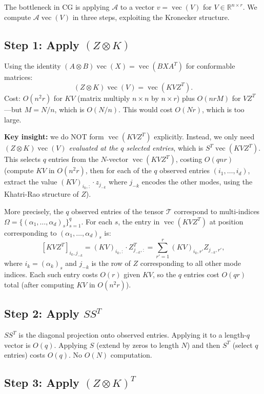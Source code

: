 \documentclass[12pt]{article}
\newcommand{\bR}{\mathbb{R}}
\DeclareMathOperator{\vecop}{vec}
\newcommand{\bR}{\mathbb{R}}
\begin{document}
The bottleneck in CG is applying $\mathcal{A}$ to a vector $v = \vecop(V)$ for $V\in\bR^{n\times r}$.  We compute $\mathcal{A}\vecop(V)$ in three steps, exploiting the Kronecker structure.

\subsection*{Step 1: Apply $(Z\otimes K)$}

Using the identity $(A\otimes B)\vecop(X) = \vecop(BXA^T)$ for conformable matrices:
\[
  (Z\otimes K)\vecop(V) = \vecop(KVZ^T).
\]
Cost: $O(n^2 r)$ for $KV$ (matrix multiply $n\times n$ by $n\times r$) plus $O(nrM)$ for $VZ^T$---but $M = N/n$, which is $O(N/n)$.  This would cost $O(N r)$, which is too large.

\textbf{Key insight:} we do NOT form $\vecop(KVZ^T)$ explicitly.  Instead, we only need $(Z\otimes K)\vecop(V)$ \emph{evaluated at the $q$ selected entries}, which is $S^T\vecop(KVZ^T)$.  This selects $q$ entries from the $N$-vector $\vecop(KVZ^T)$, costing $O(q n r)$ (compute $KV$ in $O(n^2 r)$, then for each of the $q$ observed entries $(i_1,\ldots,i_d)$, extract the value $(KV)_{i_k,:} \cdot z_{j_{-k}}$ where $j_{-k}$ encodes the other modes, using the Khatri-Rao structure of $Z$).

More precisely, the $q$ observed entries of the tensor $\mathcal{T}$ correspond to multi-indices $\Omega = \{(\alpha_1, \ldots, \alpha_d)_s\}_{s=1}^q$.  For each $s$, the entry in $\vecop(KVZ^T)$ at position corresponding to $(\alpha_1,\ldots,\alpha_d)_s$ is:
\[
  [KVZ^T]_{i_k, j_{-k}} = (KV)_{i_k,:}\cdot Z_{j_{-k},:}^T
  = \sum_{r'=1}^r (KV)_{i_k,r'} Z_{j_{-k},r'},
\]
where $i_k = (\alpha_k)_s$ and $j_{-k}$ is the row of $Z$ corresponding to all other mode indices.  Each such entry costs $O(r)$ given $KV$, so the $q$ entries cost $O(qr)$ total (after computing $KV$ in $O(n^2 r)$).

\subsection*{Step 2: Apply $S S^T$}

$SS^T$ is the diagonal projection onto observed entries.  Applying it to a length-$q$ vector is $O(q)$.  Applying $S$ (extend by zeros to length $N$) and then $S^T$ (select $q$ entries) costs $O(q)$.  No $O(N)$ computation.

\subsection*{Step 3: Apply $(Z\otimes K)^T$}
\end{document}
